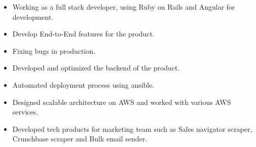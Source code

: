 \documentclass[10pt,a4paper]{altacv}
\begin{document}
\tagline{}

%

\begin{fullwidth}
\makecvheader
\end{fullwidth}

%





\begin{itemize}
	\item Working as a full stack developer, using Ruby on Rails and Angular for development.
    \item Develop End-to-End features for the product.
    \item Fixing bugs in production.
\end{itemize}

\divider
%



\begin{itemize}
  \item Developed and optimized the backend of the product.
    \item Automated deployment process using ansible.
    \item Designed scalable architecture on AWS and worked with various AWS services.
    \item Developed tech products for marketing team such as Sales navigator scraper, Crunchbase scraper and Bulk email sender.
\end{itemize}

\divider
%


\end{document}
